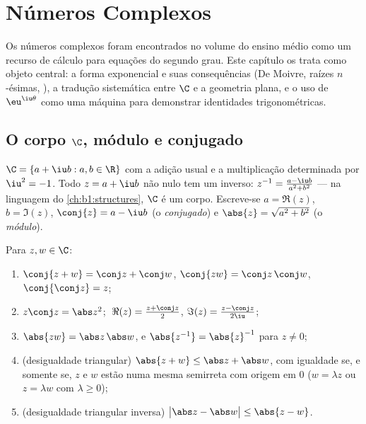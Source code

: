 \chapter{Números Complexos}\label{ch:b1:complex}

Os números complexos foram encontrados no volume do ensino médio como um
recurso de cálculo para equações do segundo grau. Este capítulo os trata
como objeto central: a forma exponencial e suas consequências (De Moivre,
raízes $n$-ésimas, ), a tradução sistemática entre $\C$ e
a geometria plana, e o uso de $\eu^{\iu\theta}$ como uma máquina para
demonstrar identidades trigonométricas.

\section{O corpo $\C$, módulo e conjugado}

\begin{definition}\label{def:b1:complex:field}
$\C = \{a + \iu b : a, b \in \R\}$ com a adição usual e a
multiplicação determinada por $\iu^2 = -1$. Todo $z = a + \iu
b$ não nulo
tem um inverso: $z^{-1} = \frac{a - \iu b}{a^2 + b^2}$ --- na
linguagem do \cref{ch:b1:structures}, $\C$ é um corpo. Escreve-se $a =
\Re(z)$, $b = \Im(z)$, $\conj{z} = a - \iu b$ (o
\emph{conjugado}) e $\abs{z} = \sqrt{a^2 + b^2}$
(o \emph{módulo}).
\end{definition}

\begin{proposition}\label{prop:b1:complex:rules}
Para $z, w \in \C$:
\begin{enumerate}
  \item $\conj{z + w} = \conj z + \conj w$, $\conj{zw} = \conj z\,
        \conj w$, $\conj{\conj z} = z$;
  \item $z \conj z = \abs z^2$; $\;\Re(z) = \frac{z + \conj z}{2}$,
        $\Im(z) = \frac{z - \conj z}{2\iu}$;
  \item $\abs{zw} = \abs z\, \abs w$, e $\abs{z^{-1}} =
        \abs{z}^{-1}$
        para $z \neq 0$;
  \item (desigualdade triangular) $\abs{z + w}
        \leq \abs z + \abs w$, com igualdade se, e somente se, $z$ e
        $w$ estão numa mesma semirreta com origem em $0$ ($w = \lambda z$ ou
        $z = \lambda w$ com $\lambda \geq 0$);
  \item (desigualdade triangular inversa) $\bigl|\abs z - \abs w\bigr|
        \leq \abs{z - w}$.
\end{enumerate}
\end{proposition}

